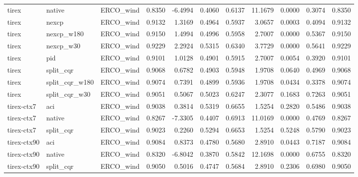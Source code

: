 \begin{tabular}{lllrrrrrrrr}
tirex & native & ERCO_wind & 0.8350 & -6.4994 & 0.4060 & 0.6137 & 11.1679 & 0.0000 & 0.3074 & 0.8350 \\
tirex & nexcp & ERCO_wind & 0.9132 & 1.3169 & 0.4964 & 0.5937 & 3.0657 & 0.0003 & 0.4094 & 0.9132 \\
tirex & nexcp_w180 & ERCO_wind & 0.9150 & 1.4994 & 0.4996 & 0.5958 & 2.7007 & 0.0000 & 0.5367 & 0.9150 \\
tirex & nexcp_w30 & ERCO_wind & 0.9229 & 2.2924 & 0.5315 & 0.6340 & 3.7729 & 0.0000 & 0.5641 & 0.9229 \\
tirex & pid & ERCO_wind & 0.9101 & 1.0128 & 0.4901 & 0.5915 & 2.7007 & 0.0054 & 0.3920 & 0.9101 \\
tirex & split_cqr & ERCO_wind & 0.9068 & 0.6782 & 0.4903 & 0.5948 & 1.9708 & 0.0640 & 0.4969 & 0.9068 \\
tirex & split_cqr_w180 & ERCO_wind & 0.9074 & 0.7391 & 0.4899 & 0.5936 & 1.9708 & 0.0434 & 0.3378 & 0.9074 \\
tirex & split_cqr_w30 & ERCO_wind & 0.9051 & 0.5067 & 0.5023 & 0.6247 & 2.3077 & 0.1683 & 0.7263 & 0.9051 \\
tirex-ctx7 & aci & ERCO_wind & 0.9038 & 0.3814 & 0.5319 & 0.6655 & 1.5254 & 0.2820 & 0.5486 & 0.9038 \\
tirex-ctx7 & native & ERCO_wind & 0.8267 & -7.3305 & 0.4407 & 0.6913 & 11.0169 & 0.0000 & 0.4769 & 0.8267 \\
tirex-ctx7 & split_cqr & ERCO_wind & 0.9023 & 0.2260 & 0.5294 & 0.6653 & 1.5254 & 0.5248 & 0.5790 & 0.9023 \\
tirex-ctx90 & aci & ERCO_wind & 0.9084 & 0.8373 & 0.4780 & 0.5680 & 2.8910 & 0.0443 & 0.7187 & 0.9084 \\
tirex-ctx90 & native & ERCO_wind & 0.8320 & -6.8042 & 0.3870 & 0.5842 & 12.1698 & 0.0000 & 0.6755 & 0.8320 \\
tirex-ctx90 & split_cqr & ERCO_wind & 0.9050 & 0.5016 & 0.4747 & 0.5684 & 2.8910 & 0.2306 & 0.6980 & 0.9050 \\
\bottomrule
\end{tabular}
